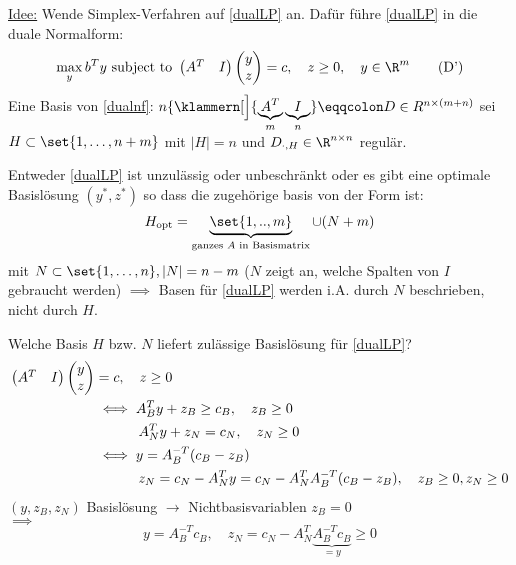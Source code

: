 \underline{Idee:} Wende Simplex-Verfahren auf \eqref{dualLP} an.
Dafür führe \eqref{dualLP} in die duale Normalform:
\begin{equation}\label{dualnf}
	\max_{y} b^{T} y \text{ subject to }
	\begin{pmatrix}
		A^{T} & I
	\end{pmatrix}
	\begin{pmatrix}
	y\\z
	\end{pmatrix}
	= c, \quad z \geq 0, \quad y \in \R^m \tag{D'}
\end{equation}
Eine Basis von \eqref{dualnf}: $n \{ \klammern[\Big]{ \underbrace{A^T}_m \underbrace I_n} \eqqcolon D
\in R^{n \times(m +n)}$
sei $H \subset \set{1,\dots ,n+m }$ mit $|H|=n$ und $D_{\cdot,H}\in \R^{n \times n}$ regulär.
\begin{theorem}
	Entweder \eqref{dualLP} ist unzulässig oder unbeschränkt oder es gibt eine optimale Basislösung $(y^*,z^*)$ so dass die zugehörige basis von der Form ist:
	\begin{equation*}
		H_{\text{opt}}=\underbrace{ \set{1,..,m }}_{\text{ganzes $A$ in Basismatrix}}\cup (N+m)
	\end{equation*}
	mit $N \subset \set{1,\dots ,n }, |N|= n-m$ ($N$ zeigt an, welche Spalten von $I$ gebraucht werden)
	$\implies$ Basen für \eqref{dualLP} werden i.A. durch $N$ beschrieben, nicht durch $H$.
\end{theorem}
Welche Basis $H$ bzw. $N$ liefert zulässige Basislösung für \eqref{dualLP}?
\begin{align*}
	\begin{pmatrix}
		A^{T}  & I
	\end{pmatrix}
	\begin{pmatrix}
	y\\z
	\end{pmatrix}
	&=c, \quad z \geq 0\\
	&{}\iff A_{B}^{T} y + z_{B} \geq c_{B}, \quad z_{B} \geq 0\\
	&{}\hspace{1.1cm} A_{N}^{T} y + z_{N} = c_{N}, \quad z_{N} \geq 0 \\
	&{}\iff y = A_{B}^{-T}(c_{B}-z_{B})\\
	&{}\hspace{1.1cm} z_{N}= c_{N} - A_{N}^{T}y = c_{N}-A_{N}^{T} A_{B}^{-T}(c_{B}-z_{B}) ,\quad z_{B}\geq 0 ,z_{N} \geq 0
\end{align*}
$(y,z_{B},z_{N})$ Basislösung $\to$ Nichtbasisvariablen $z_{B} =0$ \\
$\implies$
\begin{equation*}
	y = A_{B}^{-T}c_{B}, \quad z_{N}= c_{N}- A_{N}^{T} \underbrace{A_{B}^{-T}c_{B}}_{{=y}}\geq 0
\end{equation*}
